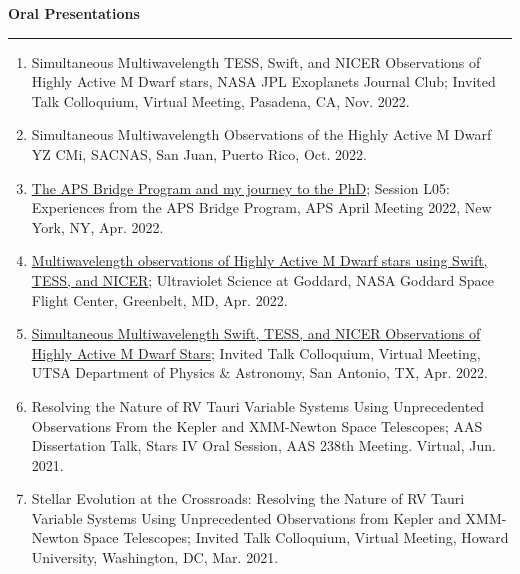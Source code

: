 \documentclass[letter,11pt]{article}
\begin{document}
\newpage
\noindent
{\bf Oral Presentations} \\
\vspace{-10mm}
\begin{center}
\rule{\textwidth}{0.2mm}
\end{center}
\vspace{-3mm}
\noindent
\begin{enumerate}[\bfseries 1.] 

\item Simultaneous Multiwavelength TESS, Swift, and NICER Observations of Highly Active M Dwarf stars, NASA JPL Exoplanets Journal Club; Invited Talk Colloquium, Virtual Meeting, Pasadena, CA, Nov. 2022.

\item Simultaneous Multiwavelength Observations of the Highly Active M Dwarf YZ CMi, SACNAS, San Juan, Puerto Rico, Oct. 2022.

\item \href{https://meetings.aps.org/Meeting/APR22/Session/L05.1}{The APS Bridge Program and my journey to the PhD}; Session L05: Experiences from the APS Bridge Program, APS April Meeting 2022, New York, NY, Apr. 2022.

\item \href{https://asd.gsfc.nasa.gov/conferences/UVsymposium2022/agenda/}{Multiwavelength observations of Highly Active M Dwarf stars using Swift, TESS, and NICER}; Ultraviolet Science at Goddard, NASA Goddard Space Flight Center, Greenbelt, MD, Apr. 2022.

\item \href{https://twitter.com/UTSA_PhyAst/status/1508503792261779464?s=20&t=dVQ_0wPfIXmUPicaAi6VLg}{Simultaneous Multiwavelength Swift, TESS, and NICER Observations of Highly Active M Dwarf Stars}; Invited Talk Colloquium, Virtual Meeting, UTSA Department of Physics \& Astronomy, San Antonio, TX, Apr. 2022. 

\item Resolving the Nature of RV Tauri Variable Systems Using Unprecedented Observations From the Kepler and XMM-Newton Space Telescopes; AAS Dissertation Talk, Stars IV Oral Session, AAS 238th Meeting. Virtual, Jun. 2021.

\item Stellar Evolution at the Crossroads: Resolving the Nature of RV Tauri Variable Systems Using Unprecedented Observations from Kepler and XMM-Newton Space Telescopes; Invited Talk Colloquium, Virtual Meeting, Howard University, Washington, DC, Mar. 2021.


\end{enumerate}
\end{document}

